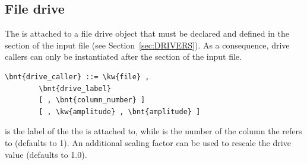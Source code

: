 \subsection{File drive}\label{sec:DriveCaller:FILE}
The  is attached to a file drive object that must be declared
and defined in the  section 
of the input file (see Section~\ref{sec:DRIVERS}).
As a consequence,  drive callers can only be instantiated
after the  section
of the input file.
\begin{Verbatim}[commandchars=\\\{\}]
    \bnt{drive_caller} ::= \kw{file} ,
        \bnt{drive_label}
        [ , \bnt{column_number} ]
        [ , \kw{amplitude} , \bnt{amplitude} ]
\end{Verbatim}
 is the label of the  
the  is attached to, while
 is the number of the column the 
refers to (defaults to 1).
An additional scaling factor  can be used to rescale
the drive value (defaults to 1.0).


